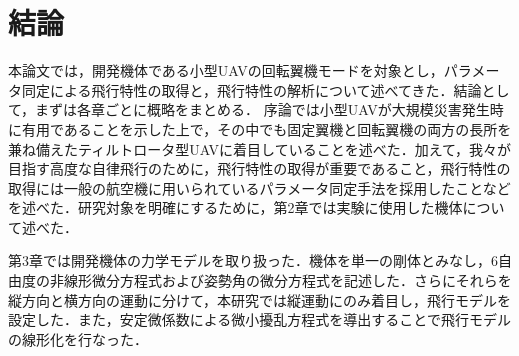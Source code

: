 
\chapter{結論}
\label{conclusion}

本論文では，開発機体である小型UAVの回転翼機モードを対象とし，パラメータ同定による飛行特性の取得と，飛行特性の解析について述べてきた．結論として，まずは各章ごとに概略をまとめる．
序論では小型UAVが大規模災害発生時に有用であることを示した上で，その中でも固定翼機と回転翼機の両方の長所を兼ね備えたティルトロータ型UAVに着目していることを述べた．加えて，我々が目指す高度な自律飛行のために，飛行特性の取得が重要であること，飛行特性の取得には一般の航空機に用いられているパラメータ同定手法を採用したことなどを述べた．研究対象を明確にするために，第2章では実験に使用した機体について述べた．

第3章では開発機体の力学モデルを取り扱った．機体を単一の剛体とみなし，6自由度の非線形微分方程式および姿勢角の微分方程式を記述した．さらにそれらを縦方向と横方向の運動に分けて，本研究では縦運動にのみ着目し，飛行モデルを設定した．また，安定微係数による微小擾乱方程式を導出することで飛行モデルの線形化を行なった．
